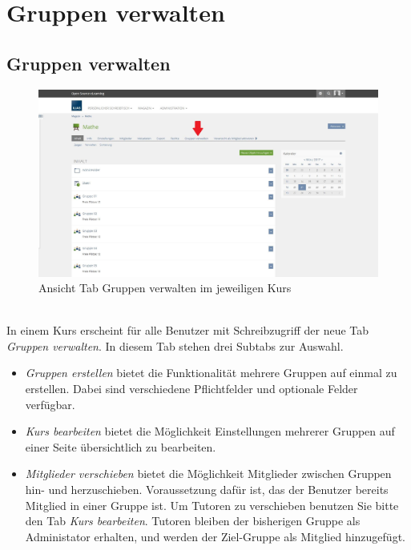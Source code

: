 \chapter{Gruppen verwalten}\label{gruppenVerwalten}
\minitoc
\clearpage


\section{Gruppen verwalten}
\begin{figure}[ht]
	\centering
	\includegraphics[width=1\textwidth]{img/gruppenverwalten.jpg}
	\caption{Ansicht Tab Gruppen verwalten im jeweiligen Kurs}
\end{figure}

~\\ In einem Kurs erscheint für alle Benutzer mit Schreibzugriff der neue Tab \textit{Gruppen verwalten}. In diesem Tab stehen drei Subtabs zur Auswahl. 
\begin{itemize}
	\item \textit{Gruppen erstellen} bietet die Funktionalität mehrere Gruppen auf einmal zu erstellen. Dabei sind verschiedene Pflichtfelder und optionale Felder verfügbar.
	\item \textit{Kurs bearbeiten} bietet die Möglichkeit Einstellungen mehrerer Gruppen auf einer Seite übersichtlich zu bearbeiten.
	\item \textit{Mitglieder verschieben} bietet die Möglichkeit Mitglieder zwischen Gruppen hin- und herzuschieben. Voraussetzung dafür ist, das der Benutzer bereits Mitglied in einer Gruppe ist. Um Tutoren zu verschieben benutzen Sie bitte den Tab \textit{Kurs bearbeiten}. Tutoren bleiben der bisherigen Gruppe als Administator erhalten, und werden der Ziel-Gruppe als Mitglied hinzugefügt.
\end{itemize} 
\clearpage


